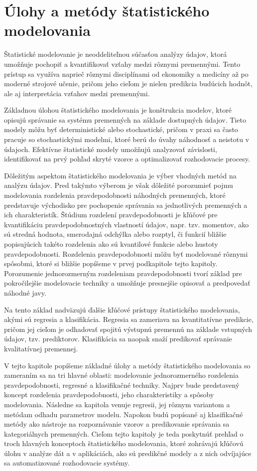 \chapter{Úlohy a metódy štatistického modelovania}\label{sec:ulohy_metody}

Štatistické modelovanie je neoddeliteľnou súčasťou analýzy údajov, ktorá umožňuje pochopiť a kvantifikovať vzťahy medzi rôznymi premennými. Tento prístup sa využíva naprieč rôznymi disciplínami od ekonomiky a medicíny až po moderné strojové učenie, pričom jeho cieľom je nielen predikcia budúcich hodnôt, ale aj interpretácia vzťahov medzi premennými.

Základnou úlohou štatistického modelovania je konštrukcia modelov, ktoré opisujú správanie sa systému premenných na základe dostupných údajov. Tieto modely môžu byť deterministické alebo stochastické, pričom v praxi sa často pracuje so stochastickými modelmi, ktoré berú do úvahy náhodnosť a neistotu v údajoch. Efektívne štatistické modely umožňujú analyzovať závislosti, identifikovať na prvý pohľad skryté vzorce a optimalizovať rozhodovacie procesy.

Dôležitým aspektom štatistického modelovania je výber vhodných metód na analýzu údajov. Pred takýmto výberom je však dôležité porozumieť pojmu modelovania rozdelenia pravdepodobnosti náhodných premenných, ktoré predstavuje východisko pre pochopenie správania sa jednotlivých premenných a ich charakteristík. Štúdium rozdelení pravdepodobnosti je kľúčové pre kvantifikáciu pravdepodobnostných vlastností údajov, napr. tzv. momentov, ako sú stredná hodnota, smerodajná odchýlka alebo rozptyl, či funkcií bližšie popisujúcich takéto rozdelenia ako sú kvantilové funkcie alebo hustoty pravdepodobnosti. Rozdelenia pravdepodobnosti môžu byť modelované rôznymi spôsobmi, ktoré si bližšie popíšeme v prvej podkapitole tejto kapitoly. Porozumenie jednorozmerným rozdeleniam pravdepodobnosti tvorí základ pre pokročilejšie modelovacie techniky a umožňuje presnejšie opisovať a predpovedať náhodné javy.

Na tento základ nadväzujú ďalšie kľúčové prístupy štatistického modelovania, akými sú regresia a klasifikácia. Regresia sa zameriava na kvantitatívne predikcie, pričom jej cieľom je odhadovať spojitú výstupnú premennú na základe vstupných údajov, tzv. prediktorov. Klasifikácia sa naopak snaží predikovať správanie kvalitatívnej premennej.

V tejto kapitole popíšeme základné úlohy a metódy štatistického modelovania so zameraním sa na tri hlavné oblasti: modelovanie jednorozmerného rozdelenia pravdepodobnosti, regresné a klasifikačné techniky. Najprv bude predstavený koncept rozdelenia pravdepodobnosti, jeho charakteristiky a spôsoby modelovania. Následne sa kapitola venuje regresii, jej rôznym variantom a metódam odhadu parametrov modelu. Napokon budú popísané aj klasifikačné metódy ako nástroje na rozpoznávanie vzorov a predikovanie správania sa kategoriálnych premenných. Cieľom tejto kapitoly je teda poskytnúť prehľad o troch hlavných konceptoch štatistického modelovania, ktoré zohrávajú kľúčovú úlohu v analýze dát a v aplikáciách, ako sú predikčné modely a z nich odvíjajúce sa automatizované rozhodovacie systémy.

